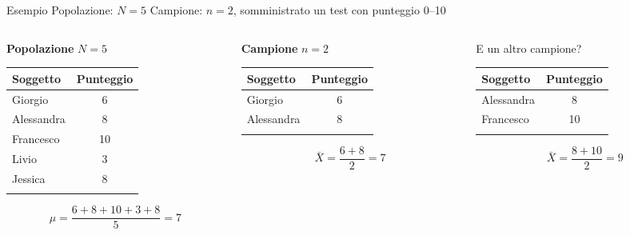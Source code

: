 \documentclass[
  ignorenonframetext,
  compress, aspectratio=149]{beamer}
\begin{document}
\begin{frame}{Esempio}
\label{esempio-1}
Popolazione: \(N = 5\) \newline Campione: \(n = 2\), somministrato un
test con punteggio 0--10

\vspace{2mm}

\begin{columns}[T]
\begin{column}{0.36\linewidth}
\centering

\textbf{Popolazione} \(N = 5\)

\small

\begin{longtable}[]{@{}lc@{}}
\toprule\noalign{}
Soggetto & Punteggio \\
\midrule\noalign{}
\endhead
Giorgio & 6 \\
Alessandra & 8 \\
Francesco & 10 \\
Livio & 3 \\
Jessica & 8 \\
\bottomrule\noalign{}
\end{longtable}

\[\mu = \dfrac{6 + 8 + 10 + 3 + 8}{5} = 7\]
\end{column}

\begin{column}{0.32\linewidth}
\centering

\textbf{Campione} \(n = 2\)

\small

\begin{longtable}[]{@{}lc@{}}
\toprule\noalign{}
Soggetto & Punteggio \\
\midrule\noalign{}
\endhead
Giorgio & 6 \\
Alessandra & 8 \\
\bottomrule\noalign{}
\end{longtable}

\[\bar{X} = \dfrac{6 + 8}{2} = 7\]
\end{column}

\begin{column}{0.32\linewidth}
\centering

E un altro campione?

\small

\begin{longtable}[]{@{}lc@{}}
\toprule\noalign{}
Soggetto & Punteggio \\
\midrule\noalign{}
\endhead
Alessandra & 8 \\
Francesco & 10 \\
\bottomrule\noalign{}
\end{longtable}

\[\bar{X} = \dfrac{8 + 10}{2} = 9\]
\end{column}
\end{columns}
\end{frame}
\end{document}
